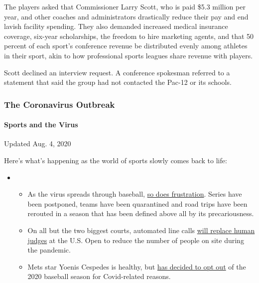 The players asked that Commissioner Larry Scott, who is paid \$5.3
million per year, and other coaches and administrators drastically
reduce their pay and end lavish facility spending. They also demanded
increased medical insurance coverage, six-year scholarships, the freedom
to hire marketing agents, and that 50 percent of each sport's conference
revenue be distributed evenly among athletes in their sport, akin to how
professional sports leagues share revenue with players.

Scott declined an interview request. A conference spokesman referred to
a statement that said the group had not contacted the Pac-12 or its
schools.

\hypertarget{the-coronavirus-outbreak}{%
\subsubsection{The Coronavirus
Outbreak}\label{the-coronavirus-outbreak}}

\hypertarget{sports-and-the-virus}{%
\paragraph{Sports and the Virus}\label{sports-and-the-virus}}

Updated Aug. 4, 2020

Here's what's happening as the world of sports slowly comes back to
life:

\begin{itemize}
\item
  \begin{itemize}
  \tightlist
  \item
    As the virus spreads through baseball,
    \href{https://www.nytimes3xbfgragh.onion/2020/08/03/sports/baseball/mlb-coronavirus-outbreak.html?action=click\&pgtype=Article\&state=default\&region=MAIN_CONTENT_2\&context=storylines_keepup}{so
    does frustration}. Series have been postponed, teams have been
    quarantined and road trips have been rerouted in a season that has
    been defined above all by its precariousness.
  \item
    On all but the two biggest courts, automated line calls
    \href{https://www.nytimes3xbfgragh.onion/2020/08/03/sports/tennis/us-open-hawkeye-line-judges.html?action=click\&pgtype=Article\&state=default\&region=MAIN_CONTENT_2\&context=storylines_keepup}{will
    replace human judges} at the U.S. Open to reduce the number of
    people on site during the pandemic.
  \item
    Mets star Yoenis Cespedes is healthy, but
    \href{https://www.nytimes3xbfgragh.onion/2020/08/02/sports/baseball/Yoenis-cespedes-opt-out-rule.html?action=click\&pgtype=Article\&state=default\&region=MAIN_CONTENT_2\&context=storylines_keepup}{has
    decided to opt out} of the 2020 baseball season for Covid-related
    reasons.
  \end{itemize}
\end{itemize}

